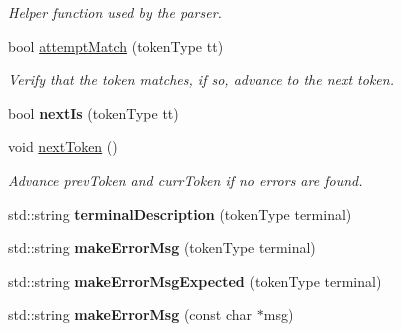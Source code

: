 \begin{DoxyCompactItemize}
\begin{DoxyCompactList}\small\item\em Helper function used by the parser. \end{DoxyCompactList}\item 
\hypertarget{classParser_a151ffb920a67527813d77bc4ba44c4a7}{bool \hyperlink{classParser_a151ffb920a67527813d77bc4ba44c4a7}{attempt\-Match} (token\-Type tt)}\label{classParser_a151ffb920a67527813d77bc4ba44c4a7}

\begin{DoxyCompactList}\small\item\em Verify that the token matches, if so, advance to the next token. \end{DoxyCompactList}\item 
\hypertarget{classParser_a67a10b685bd263477b5f59f1923cdec3}{bool {\bfseries next\-Is} (token\-Type tt)}\label{classParser_a67a10b685bd263477b5f59f1923cdec3}

\item 
\hypertarget{classParser_a324a5bb61c9dfc645300a92aecd6fe69}{void \hyperlink{classParser_a324a5bb61c9dfc645300a92aecd6fe69}{next\-Token} ()}\label{classParser_a324a5bb61c9dfc645300a92aecd6fe69}

\begin{DoxyCompactList}\small\item\em Advance prev\-Token and curr\-Token if no errors are found. \end{DoxyCompactList}\item 
\hypertarget{classParser_a1f45059a13bc0c98355278a9ca9feed9}{std\-::string {\bfseries terminal\-Description} (token\-Type terminal)}\label{classParser_a1f45059a13bc0c98355278a9ca9feed9}

\item 
\hypertarget{classParser_a341bee73e8b1e8558505a237846b16b3}{std\-::string {\bfseries make\-Error\-Msg} (token\-Type terminal)}\label{classParser_a341bee73e8b1e8558505a237846b16b3}

\item 
\hypertarget{classParser_ad38e58ddee85db2aecbd3c7bdcf42116}{std\-::string {\bfseries make\-Error\-Msg\-Expected} (token\-Type terminal)}\label{classParser_ad38e58ddee85db2aecbd3c7bdcf42116}

\item 
\hypertarget{classParser_a60c23daeffb7ced92599e4f2555f71c9}{std\-::string {\bfseries make\-Error\-Msg} (const char $\ast$msg)}\label{classParser_a60c23daeffb7ced92599e4f2555f71c9}

\end{DoxyCompactItemize}
